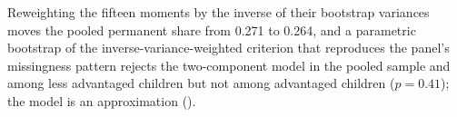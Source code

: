 Reweighting the fifteen moments by the inverse of their bootstrap variances moves the pooled permanent share from 0.271 to 0.264, and a parametric bootstrap of the inverse-variance-weighted criterion that reproduces the panel's missingness pattern rejects the two-component model in the pooled sample and among less advantaged children but not among advantaged children ($p = 0.41$); the model is an approximation ().%
